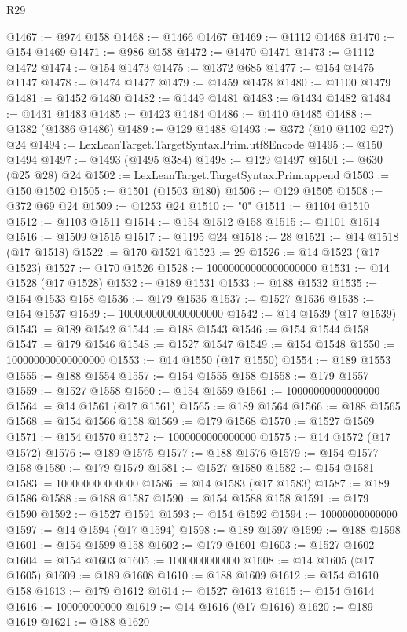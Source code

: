 \begin{lexlean}{R29}
\begin{coremodule}
@1467 := @974 @158
@1468 := @1466 @1467
@1469 := @1112 @1468
@1470 := @154 @1469
@1471 := @986 @158
@1472 := @1470 @1471
@1473 := @1112 @1472
@1474 := @154 @1473
@1475 := @1372 @685
@1477 := @154 @1475 @1147
@1478 := @1474 @1477
@1479 := @1459 @1478
@1480 := @1100 @1479
@1481 := @1452 @1480
@1482 := @1449 @1481
@1483 := @1434 @1482
@1484 := @1431 @1483
@1485 := @1423 @1484
@1486 := @1410 @1485
@1488 := @1382 (@1386 @1486)
@1489 := @129 @1488
@1493 := @372 (@10 @1102 @27) @24
@1494 := LexLeanTarget.TargetSyntax.Prim.utf8Encode
@1495 := @150 @1494
@1497 := @1493 (@1495 @384)
@1498 := @129 @1497
@1501 := @630 (@25 @28) @24
@1502 := LexLeanTarget.TargetSyntax.Prim.append
@1503 := @150 @1502
@1505 := @1501 (@1503 @180)
@1506 := @129 @1505
@1508 := @372 @69 @24
@1509 := @1253 @24
@1510 := "0"
@1511 := @1104 @1510
@1512 := @1103 @1511
@1514 := @154 @1512 @158
@1515 := @1101 @1514
@1516 := @1509 @1515
@1517 := @1195 @24
@1518 := 28
@1521 := @14 @1518 (@17 @1518)
@1522 := @170 @1521
@1523 := 29
@1526 := @14 @1523 (@17 @1523)
@1527 := @170 @1526
@1528 := 10000000000000000000
@1531 := @14 @1528 (@17 @1528)
@1532 := @189 @1531
@1533 := @188 @1532
@1535 := @154 @1533 @158
@1536 := @179 @1535
@1537 := @1527 @1536
@1538 := @154 @1537
@1539 := 1000000000000000000
@1542 := @14 @1539 (@17 @1539)
@1543 := @189 @1542
@1544 := @188 @1543
@1546 := @154 @1544 @158
@1547 := @179 @1546
@1548 := @1527 @1547
@1549 := @154 @1548
@1550 := 100000000000000000
@1553 := @14 @1550 (@17 @1550)
@1554 := @189 @1553
@1555 := @188 @1554
@1557 := @154 @1555 @158
@1558 := @179 @1557
@1559 := @1527 @1558
@1560 := @154 @1559
@1561 := 10000000000000000
@1564 := @14 @1561 (@17 @1561)
@1565 := @189 @1564
@1566 := @188 @1565
@1568 := @154 @1566 @158
@1569 := @179 @1568
@1570 := @1527 @1569
@1571 := @154 @1570
@1572 := 1000000000000000
@1575 := @14 @1572 (@17 @1572)
@1576 := @189 @1575
@1577 := @188 @1576
@1579 := @154 @1577 @158
@1580 := @179 @1579
@1581 := @1527 @1580
@1582 := @154 @1581
@1583 := 100000000000000
@1586 := @14 @1583 (@17 @1583)
@1587 := @189 @1586
@1588 := @188 @1587
@1590 := @154 @1588 @158
@1591 := @179 @1590
@1592 := @1527 @1591
@1593 := @154 @1592
@1594 := 10000000000000
@1597 := @14 @1594 (@17 @1594)
@1598 := @189 @1597
@1599 := @188 @1598
@1601 := @154 @1599 @158
@1602 := @179 @1601
@1603 := @1527 @1602
@1604 := @154 @1603
@1605 := 1000000000000
@1608 := @14 @1605 (@17 @1605)
@1609 := @189 @1608
@1610 := @188 @1609
@1612 := @154 @1610 @158
@1613 := @179 @1612
@1614 := @1527 @1613
@1615 := @154 @1614
@1616 := 100000000000
@1619 := @14 @1616 (@17 @1616)
@1620 := @189 @1619
@1621 := @188 @1620

\end{coremodule}
\end{lexlean}

